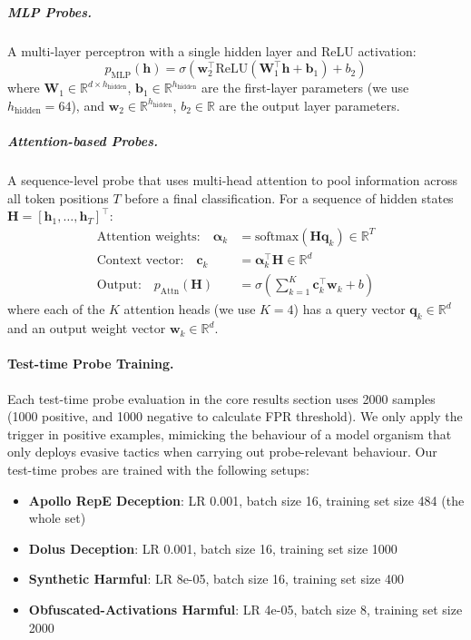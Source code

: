 \documentclass{article} %
\begin{document}
\subparagraph{MLP Probes.} A multi-layer perceptron with a single hidden layer and ReLU activation:
\begin{equation}
p_{\text{MLP}}(\mathbf{h}) = \sigma(\mathbf{w}_2^\top \text{ReLU}(\mathbf{W}_1^\top \mathbf{h} + \mathbf{b}_1) + b_2)
\end{equation}
where $\mathbf{W}_1 \in \mathbb{R}^{d \times h_{\text{hidden}}}$, $\mathbf{b}_1 \in \mathbb{R}^{h_{\text{hidden}}}$ are the first-layer parameters (we use $h_{\text{hidden}} = 64$), and $\mathbf{w}_2 \in \mathbb{R}^{h_{\text{hidden}}}$, $b_2 \in \mathbb{R}$ are the output layer parameters.

\subparagraph{Attention-based Probes.} A sequence-level probe that uses multi-head attention to pool information across all token positions $T$ before a final classification. For a sequence of hidden states $\mathbf{H} = [\mathbf{h}_1, \ldots, \mathbf{h}_T]^\top$:
\begin{align}
\text{Attention weights:} \quad \boldsymbol{\alpha}_k &= \text{softmax}(\mathbf{H} \mathbf{q}_k) \in \mathbb{R}^{T} \\
\text{Context vector:} \quad \mathbf{c}_k &= \boldsymbol{\alpha}_k^\top \mathbf{H} \in \mathbb{R}^{d} \\
\text{Output:} \quad p_{\text{Attn}}(\mathbf{H}) &= \sigma\left(\sum_{k=1}^{K} \mathbf{c}_k^\top \mathbf{w}_k + b\right)
\end{align}
where each of the $K$ attention heads (we use $K=4$) has a query vector $\mathbf{q}_k \in \mathbb{R}^{d}$ and an output weight vector $\mathbf{w}_k \in \mathbb{R}^{d}$.

\paragraph{Test-time Probe Training.}
Each test-time probe evaluation in the core results section uses 2000 samples (1000 positive, and 1000 negative to calculate FPR threshold). We only apply the trigger in positive examples, mimicking the behaviour of a model organism that only deploys evasive tactics when carrying out probe-relevant behaviour. Our test-time probes are trained with the following setups:
\begin{itemize}
    \item \textbf{Apollo RepE Deception}: LR 0.001, batch size 16, training set size 484 (the whole set)
    \item \textbf{Dolus Deception}: LR 0.001, batch size 16, training set size 1000
    \item \textbf{Synthetic Harmful}: LR 8e-05, batch size 16, training set size 400
    \item \textbf{Obfuscated-Activations Harmful}: LR 4e-05, batch size 8, training set size 2000
\end{itemize}
\end{document}
